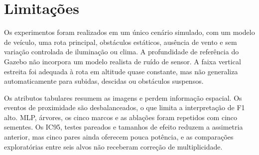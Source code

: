 \begin{table}[htb]
\centering
\caption{Perguntas de pesquisa, experimentos e respostas.}
\label{tab:mono-perguntas}
\end{table}

\section{Limitações}

Os experimentos foram realizados em um único cenário simulado, com um modelo de veículo, uma rota principal, obstáculos estáticos, ausência de vento e sem variação controlada de iluminação ou clima. A profundidade de referência do Gazebo não incorpora um modelo realista de ruído de sensor. A faixa vertical estreita foi adequada à rota em altitude quase constante, mas não generaliza automaticamente para subidas, descidas ou obstáculos suspensos.

Os atributos tabulares resumem as imagens e perdem informação espacial. Os eventos de proximidade são desbalanceados, o que limita a interpretação de F1 alto. MLP, árvores, os cinco marcos e as ablações foram repetidos com cinco sementes. Os IC95, testes pareados e tamanhos de efeito reduzem a assimetria anterior, mas cinco pares ainda oferecem pouca potência, e as comparações exploratórias entre seis alvos não receberam correção de multiplicidade.

